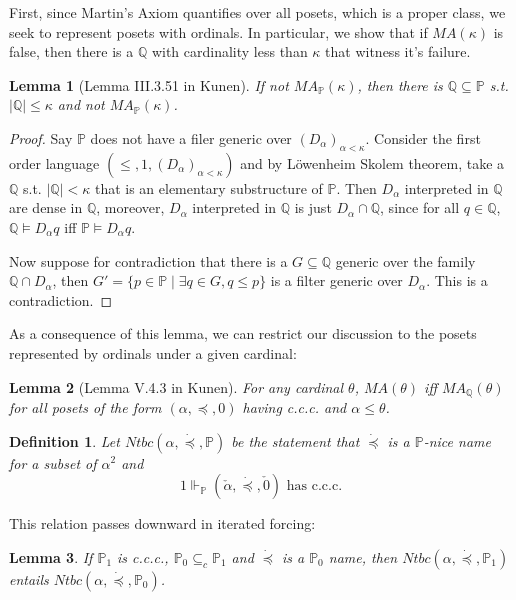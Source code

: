 \documentclass{article}
\newtheorem{definition}{Definition}
\newtheorem{lemma}{Lemma}
\newcommand{\bbP}{\mathbb{P}}
\newcommand{\bbQ}{\mathbb{Q}}
\begin{document}
First, since Martin's Axiom quantifies over all posets, which is a proper class, we seek to represent posets with ordinals. In particular, we show that if $MA(\kappa)$ is false, then there is a $\bbQ$ with cardinality less than $\kappa$ that witness it's failure.

\begin{lemma}[Lemma III.3.51 in Kunen]
    If not $MA_\bbP(\kappa)$, then there is $\bbQ\subseteq \bbP$ s.t. $|\bbQ|\leq \kappa$ and not $MA_\bbP(\kappa)$.
\end{lemma}

\begin{proof}
    Say $\bbP$ does not have a filer generic over $(D_\alpha)_{\alpha<\kappa}$.
    Consider the first order language $(\leq,1,(D_\alpha)_{\alpha<\kappa})$ and by L\"owenheim  Skolem theorem, take a $\bbQ$ s.t. $|\bbQ|<\kappa$ that is an elementary substructure of $\bbP$. Then $D_\alpha$ interpreted in $\bbQ$ are dense in $\bbQ$, moreover, $D_\alpha$ interpreted in $\bbQ$ is just $D_\alpha\cap \bbQ$, since for all $q\in \bbQ$, $\bbQ\models D_\alpha q$ iff $\bbP\models D_\alpha q$.

    Now suppose for contradiction that there is a $G\subseteq \bbQ$ generic over the family $\bbQ\cap D_\alpha$, then $G' = \{p\in \bbP\mid \exists q\in G, q\leq p\}$ is a filter generic over $D_\alpha$. This is a contradiction.
\end{proof}

As a consequence of this lemma, we can restrict our discussion to the posets represented by ordinals under a given cardinal:

\begin{lemma}[Lemma V.4.3 in Kunen]\label{lem:10}
    For any cardinal $\theta$, $MA(\theta)$ iff $MA_\bbQ(\theta)$ for all posets of the form $(\alpha, \preceq, 0)$ having c.c.c. and $\alpha\leq \theta$.
\end{lemma}



\begin{definition}
    Let $Ntbc(\alpha,\dot{\preceq},\bbP)$ be the statement that $\dot{\preceq}$ is a $\bbP$-nice name for a subset of $\alpha^2$ and $$1\Vdash_\bbP (\check{\alpha},\dot{\preceq},\check{0})\text{ has c.c.c.}$$
\end{definition}

This relation passes downward in iterated forcing:

\begin{lemma}
    If $\bbP_1$ is c.c.c., $\bbP_0\subseteq_c\bbP_1$ and $\dot{\preceq}$ is a $\bbP_0$ name, then $Ntbc(\alpha,\dot{\preceq},\bbP_1)$ entails $Ntbc(\alpha,\dot{\preceq},\bbP_0)$.
\end{lemma}
\end{document}
